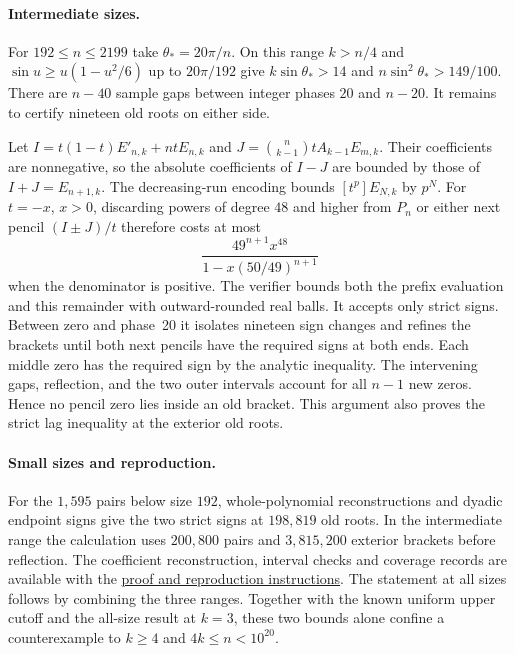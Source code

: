 \paragraph{Intermediate sizes.}
For $192\le n\le2199$ take $\theta_*=20\pi/n$. On this range
$k>n/4$ and $\sin u\ge u(1-u^2/6)$ up to $20\pi/192$ give
$k\sin\theta_*>14$ and $n\sin^2\theta_*>149/100$. There are
$n-40$ sample gaps between integer phases $20$ and $n-20$.
It remains to certify nineteen old roots on either side.

Let $I=t(1-t)E'_{n,k}+ntE_{n,k}$ and
$J=\binom n{k-1}t A_{k-1}E_{m,k}$. Their coefficients are
nonnegative, so the absolute coefficients of $I-J$ are bounded by
those of $I+J=E_{n+1,k}$. The decreasing-run encoding bounds
$[t^p]E_{N,k}$ by $p^N$. For $t=-x$, $x>0$, discarding powers
of degree $48$ and higher from $P_n$ or either next pencil
$(I\pm J)/t$ therefore costs at most
\[
 \frac{49^{n+1} x^{48}}{1-x(50/49)^{n+1}}
\]
when the denominator is positive. The verifier bounds both the
prefix evaluation and this remainder with outward-rounded real
balls. It accepts only strict signs. Between zero and phase~20
it isolates nineteen sign changes and refines the brackets until
both next pencils have the required signs at both ends. Each
middle zero has the required sign by the analytic inequality.
The intervening gaps, reflection, and the two outer intervals
account for all $n-1$ new zeros. Hence no pencil zero lies inside
an old bracket. This argument also proves the strict lag inequality
at the exterior old roots.

\paragraph{Small sizes and reproduction.}
For the $1{,}595$ pairs below size $192$, whole-polynomial
reconstructions and dyadic endpoint signs give the two strict signs
at $198{,}819$ old roots. In the intermediate range the calculation
uses $200{,}800$ pairs and $3{,}815{,}200$ exterior brackets before
reflection. The coefficient reconstruction, interval checks and
coverage records are available with the
\href{https://github.com/ProgramComputer/open-math-research/blob/main/topics/long-cycle-excedances/three-cycle-complete.md}{proof and reproduction instructions}.
The statement at all sizes follows by combining the three ranges.
Together with the known uniform upper cutoff and the all-size result
at $k=3$, these two bounds alone confine a counterexample to $k\ge4$ and
$4k\le n<10^{20}$.
